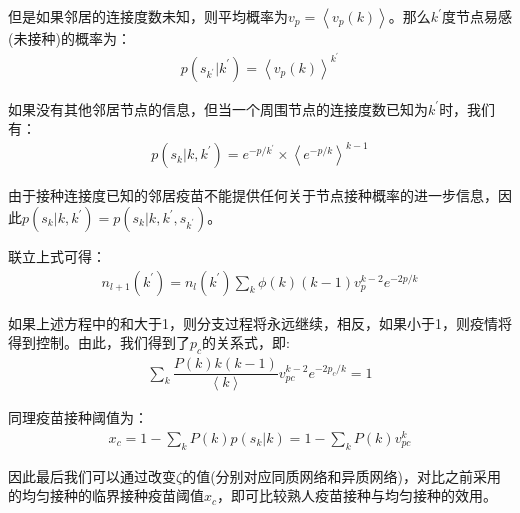 \documentclass[UTF8]{ctexart}
\begin{document}
\par 但是如果邻居的连接度数未知，则平均概率为$v_{p}=\left\langle v_{p}(k)\right\rangle$。那么$k^{\prime}$度节点易感(未接种)的概率为：
\begin{equation}
	\begin{aligned}
		p(s_{k^{\prime}}|k^{\prime})=\left\langle v_{p}(k)\right\rangle^{k^{\prime}}
	\end{aligned}
\end{equation}
\par 如果没有其他邻居节点的信息，但当一个周围节点的连接度数已知为$k^{\prime}$时，我们有：
\begin{equation}
	\begin{aligned}
		p(s_{k}|k,k^{\prime})=e^{-p/k^{\prime}}\times \left\langle e^{-p/k}\right\rangle^{k-1}
	\end{aligned}
\end{equation}
\par 由于接种连接度已知的邻居疫苗不能提供任何关于节点接种概率的进一步信息，因此$p(s_{k}|k,k^{\prime})=p(s_{k}|k,k^{\prime},s_{k^{\prime}})$。
\par 联立上式可得：
\begin{equation}
	\begin{aligned}
		n_{l+1}(k^{\prime})=n_{l}(k^{\prime})\sum\limits_{k}\phi(k)(k-1)v_{p}^{k-2}e^{-2p/k}
	\end{aligned}
\end{equation}
\par 如果上述方程中的和大于1，则分支过程将永远继续，相反，如果小于1，则疫情将得到控制。由此，我们得到了$p_{c}$的关系式，即:
\begin{equation}
	\begin{aligned}
		\sum\limits_{k}\dfrac{P(k)k(k-1)}{\left\langle k\right\rangle}v_{pc}^{k-2}e^{-2p_{c}/k}=1
	\end{aligned}
\end{equation}
\par 同理疫苗接种阈值为：
\begin{equation}
	\begin{aligned}
		x_{c}=1-\sum\limits_{k}P(k)p(s_{k}|k)=1-\sum\limits_{k}P(k)v_{pc}^{k}
	\end{aligned}
\end{equation}
\par 因此最后我们可以通过改变$\zeta$的值(分别对应同质网络和异质网络)，对比之前采用的均匀接种的临界接种疫苗阈值$x_{c}$，即可比较熟人疫苗接种与均匀接种的效用。
\end{document}
